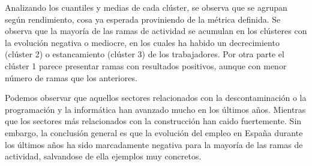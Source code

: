 \documentclass[Universitat de
València,article,submit,moreauthors,pdftex]{Definitions/mdpi}
\begin{document}
Analizando los cuantiles y medias de cada clúster, se observa que se
agrupan según rendimiento, cosa ya esperada proviniendo de la métrica
definida. Se observa que la mayoría de las ramas de actividad se
acumulan en los clústeres con la evolución negativa o mediocre, en los
cuales ha habido un decrecimiento (clúster 2) o estancamiento (clúster
3) de los trabajadores. Por otra parte el clúster 1 parece presentar
ramas con resultados positivos, aunque con menor número de ramas que los
anteriores.

Podemos observar que aquellos sectores relacionados con la
descontaminación o la programación y la informática han avanzado mucho
en los últimos años. Mientras que los sectores más relacionados con la
construcción han caido fuertemente. Sin embargo, la conclusión general
es que la evolución del empleo en España durante los últimos años ha
sido marcadamente negativa para la mayoría de las ramas de actividad,
salvandose de ella ejemplos muy concretos.


\vspace{6pt}











\end{document}
